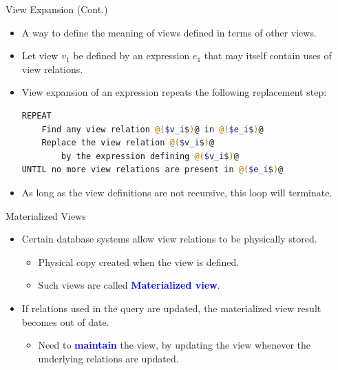 \documentclass[aspectratio=169]{beamer}
\begin{document}
\begin{frame}[fragile]{View Expansion (Cont.)}
    \begin{itemize}
        \item A way to define the meaning of views defined in terms of other views.
        \item Let view $v_1$ be defined by an expression $e_1$ that may itself contain uses of view relations.
        \item View expansion of an expression repeats the following replacement step:
            \footnotesize
            \begin{lstlisting}[language=bash]
REPEAT
    Find any view relation @($v_i$)@ in @($e_i$)@
    Replace the view relation @($v_i$)@
        by the expression defining @($v_i$)@
UNTIL no more view relations are present in @($e_i$)@
            \end{lstlisting}
            \normalsize
        \item As long as the view definitions are not recursive, this loop will terminate.
    \end{itemize}
\end{frame}

\begin{frame}{Materialized Views}
    \begin{itemize}
        \item Certain database systems allow view relations to be physically stored.
            \begin{itemize}
                \item Physical copy created when the view is defined.
                \item Such views are called \textbf{\textcolor{blue}{Materialized view}}.
            \end{itemize}
        \item If relations used in the query are updated, the materialized view result becomes out of date.
            \begin{itemize}
                \item Need to \textcolor{blue}{\textbf{maintain}} the view, by updating the view whenever the underlying relations are updated.
            \end{itemize}
    \end{itemize}
\end{frame}
\end{document}

